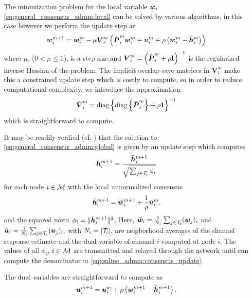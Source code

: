\documentclass{article}
\begin{document}
The minimization problem for the local variable \({\bm{w}}_i\) \eqref{eq:general_consensus_admm:local} can be solved by various algorithms, in this case however we perform the update step as
\begin{equation}
    {\bm{w}}_i^{m+1} = {\bm{w}}_i^{m} - \mu \bm{{V}}_i^m \left( \hat{{\bm{{P}}}}_i^m {\bm{w}}_i^m + {\bm{u}}_i^m + \rho\left({\bm{w}}_i^m - \tilde{{\bm{h}}}_i^{m}\right)\right)\label{eq:online_admm:local_update}
\end{equation}
where \(\mu\), (\(0  < \mu\leq 1\)), is a step size and \(\bm{{V}}_i^m = \left(\hat{{\bm{{P}}}}_i^m + \rho \bm{\mathrm{I}} \right)^{-1}\) is the regularized inverse Hessian of the problem.
The implicit overlap-save matrices in \(\bm{{V}}_i^m\) make this a constrained update step which is costly to compute, so in order to reduce computational complexity, we introduce the approximation
\begin{equation}
    \tilde{\bm{{V}}}_i^m = \operatorname{diag} \left\{ \operatorname{diag} \left\{ \hat{{\bm{{P}}}}_i^m \right\} + \rho \bm{\mathrm{1}} \right\}^{-1}
\end{equation}
which is straightforward to compute.

It may be readily verified (cf. \cite{boydDistributedOptimizationStatistical2011}) that the solution to \eqref{eq:general_consensus_admm:global} is given by an update step which computes
\begin{equation}
    {\bm{h}}_i^{m+1} = \frac{\bar{{\bm{h}}}_i^{m+1}}{\sqrt{\sum_{j \in \mathcal{T}_i} \phi_i}}\label{eq:online_admm:consensus_update}
\end{equation}
for each node \(i \in \mathcal{M}\) with the local unnormalized consensus
\begin{equation}
    \bar{{\bm{h}}}_i^{m+1} = \bar{{\bm{w}}}_i^{m+1} + \frac{1}{\rho} \bar{{\bm{u}}}_i^{m}.
\end{equation}
and the squared norm \(\phi_i = \|\bar{{\bm{h}}}_i^{m+1}\|^2\).
Here, \(\bar{{\bm{w}}}_i = \frac{1}{N_i} \sum_{j \in \mathcal{T}_i} ({\bm{w}}_j)_i\) and \(\bar{{\bm{u}}}_i = \frac{1}{N_i} \sum_{j \in \mathcal{T}_i} ({\bm{u}}_j)_i\), with \(N_i = | \mathcal{T}_i |\), are neigborhood averages of the channel response estimate and the dual variable of channel \(i\) computed at node \(i\). The values of all \(\phi_i\), \(i \in \mathcal{M}\) are transmitted and relayed through the network until can compute the denominator in \eqref{eq:online_admm:consensus_update}.

The dual variables are straightforward to compute as
\begin{equation}
    {\bm{u}}_i^{m+1} = {\bm{u}}_i^{m} + \rho \left( {\bm{w}}_i^{m+1} - \tilde{{\bm{h}}}_i^{m+1} \right).\label{eq:online_admm:dual_update}
\end{equation}
\end{document}
